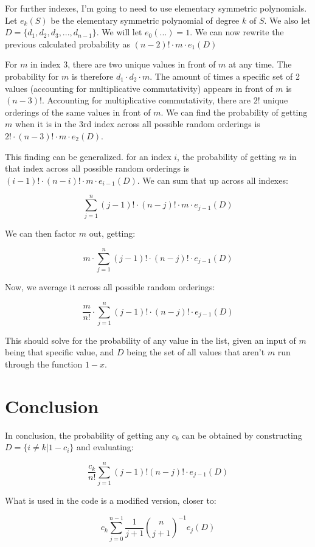 \documentclass{article}
\begin{document}
For further indexes, I'm going to need to use elementary symmetric polynomials. Let $e_{k}(S)$ be the elementary symmetric polynomial of degree $k$ of $S$. We also let $D = \{d_1, d_2, d_3, ..., d_{n-1}\}$. We will let $e_0(...) = 1$. We can now rewrite the previous calculated probability as $(n - 2)! \cdot m \cdot e_1(D)$

For $m$ in index 3, there are two unique values in front of $m$ at any time. The probability for $m$ is therefore $d_1 \cdot d_2 \cdot m$. The amount of times a specific set of 2 values (accounting for multiplicative commutativity) appears in front of $m$ is $(n - 3)!$. Accounting for multiplicative commutativity, there are $2!$ unique orderings of the same values in front of $m$. We can find the probability of getting $m$ when it is in the 3rd index across all possible random orderings is $2! \cdot (n - 3)! \cdot m \cdot e_2(D)$.

This finding can be generalized. for an index $i$, the probability of getting $m$ in that index across all possible random orderings is $(i - 1)! \cdot (n - i)! \cdot m \cdot e_{i - 1}(D)$. We can sum that up across all indexes:

$$\sum^n_{j=1} (j - 1)! \cdot (n - j)! \cdot m \cdot e_{j - 1}(D)$$

We can then factor $m$ out, getting:

$$m \cdot \sum^n_{j=1} (j - 1)! \cdot (n - j)! \cdot e_{j - 1}(D)$$

Now, we average it across all possible random orderings:

$$\frac{m}{n!} \cdot \sum^n_{j=1} (j - 1)! \cdot (n - j)! \cdot e_{j - 1}(D)$$

This should solve for the probability of any value in the list, given an input of $m$ being that specific value, and $D$ being the set of all values that aren't $m$ run through the function $1 - x$.

\section{Conclusion}

In conclusion, the probability of getting any $c_k$ can be obtained by constructing $D = \{i \ne k \vert 1 - c_i\}$ and evaluating:

$$\frac{c_k}{n!} \sum^n_{j=1} (j - 1)!(n - j)! \cdot e_{j - 1}(D)$$

What is used in the code is a modified version, closer to:

$$c_k \sum^{n-1}_{j=0} \frac{1}{j+1}\binom{n}{j+1}^{-1}e_{j}(D)$$
\end{document}
